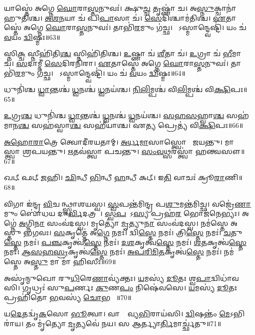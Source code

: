 𑌯𑌾𑌸𑍍𑌤𑍇॑ 𑌅𑌗𑍍𑌨𑍇 \ul{𑌘𑍋}𑌰𑌾\ul{𑌸𑍍𑌤}𑌨𑍁𑌵𑌃॑। 
𑌕𑍍𑌷𑍁\ul{𑌚𑍍𑌚} 𑌤𑍃𑌷𑍍𑌣𑌾॑ 𑌚। 
𑌅\ul{𑌸𑍍𑌨𑍁}𑌕𑍍𑌚𑌾𑌨𑌾॑𑌹𑍁𑌤𑌿𑌶𑍍𑌚। 
\ul{𑌅}\ul{𑌶}\ul{𑌨}𑌯𑌾 𑌚॑ 𑌪𑌿\ul{𑌪𑌾}𑌸𑌾 𑌚॑। 
\ul{𑌸𑍇}𑌦𑌿𑌶𑍍𑌚𑌾𑌮॑𑌤𑌿𑌶𑍍𑌚। 
\ul{𑌏}𑌤𑌾𑌸𑍍𑌤𑍇॑ 𑌅𑌗𑍍𑌨𑍇 \ul{𑌘𑍋}𑌰𑌾\ul{𑌸𑍍𑌤}𑌨𑍁𑌵𑌃॑। 
𑌤𑌾𑌭𑌿॑\ul{𑌰}𑌮𑍁𑌂 𑌗॑𑌚𑍍𑌛। 
𑌯𑍋᳚𑌽𑌸𑍍𑌮𑌾𑌨𑍍𑌦𑍍𑌵𑍇𑌷𑍍𑌟𑌿॑। 
𑌯𑌂 𑌚॑ \ul{𑌵}𑌯𑌂 \ul{𑌦𑍍𑌵𑌿}𑌷𑍍𑌮𑌃॥63॥
\anuvakamend

𑌸𑍍𑌨𑌿\ul{𑌕𑍍𑌚} 𑌸𑍍𑌨𑍀𑌹𑌿॑𑌤𑌿\ul{𑌶𑍍𑌚} 𑌸𑍍𑌨𑌿𑌹𑌿॑𑌤𑌿𑌶𑍍𑌚। 
\ul{𑌉}𑌷𑍍𑌣𑌾 𑌚॑ \ul{𑌶𑍀}𑌤𑌾 𑌚॑। 
\ul{𑌉}𑌗𑍍𑌰𑌾 𑌚॑ \ul{𑌭𑍀}𑌮𑌾 𑌚॑। 
\ul{𑌸}𑌦𑌾𑌮𑍍𑌨𑍀॑ \ul{𑌸𑍇}𑌦𑌿𑌰𑌨𑌿॑𑌰𑌾। 
\ul{𑌏}𑌤𑌾𑌸𑍍𑌤𑍇॑ 𑌅𑌗𑍍𑌨𑍇 \ul{𑌘𑍋}𑌰𑌾\ul{𑌸𑍍𑌤}𑌨𑍁𑌵𑌃॑। 
𑌤𑌾𑌭𑌿॑\ul{𑌰}𑌮𑍁𑌂 𑌗॑𑌚𑍍𑌛। 
𑌯𑍋᳚𑌽𑌸𑍍𑌮𑌾𑌨𑍍𑌦𑍍𑌵𑍇𑌷𑍍𑌟𑌿॑। 
𑌯𑌂 𑌚॑ \ul{𑌵}𑌯𑌂 \ul{𑌦𑍍𑌵𑌿}𑌷𑍍𑌮𑌃॥64॥
\anuvakamend

𑌧𑍁𑌨𑌿॑𑌶𑍍𑌚 \ul{𑌧𑍍𑌵𑌾}𑌨𑍍𑌤𑌶𑍍𑌚॑ \ul{𑌧𑍍𑌵}𑌨𑌶𑍍𑌚॑ \ul{𑌧𑍍𑌵}𑌨𑌯॑𑌶𑍍𑌚। 
\ul{𑌨𑌿}\ul{𑌲𑌿}𑌮𑍍𑌪𑌶𑍍𑌚॑ 𑌵𑌿\ul{𑌲𑌿}𑌮𑍍𑌪𑌶𑍍𑌚॑ 𑌵𑌿\ul{𑌕𑍍𑌷𑌿}𑌪𑌃॥65॥
\anuvakamend

\ul{𑌉}𑌗𑍍𑌰\ul{𑌶𑍍𑌚} 𑌧𑍁𑌨𑌿॑𑌶𑍍𑌚 \ul{𑌧𑍍𑌵𑌾}𑌨𑍍𑌤𑌶𑍍𑌚॑ \ul{𑌧𑍍𑌵}𑌨𑌶𑍍𑌚॑ \ul{𑌧𑍍𑌵}𑌨𑌯॑𑌶𑍍𑌚। 
\ul{𑌸}\ul{𑌹}\ul{𑌸}𑌹𑍍𑌵𑌾\ul{𑌶𑍍𑌚} 𑌸𑌹॑𑌮𑌾𑌨\ul{𑌶𑍍𑌚} 𑌸𑌹॑𑌸𑍍𑌵𑌾\ul{𑌶𑍍𑌚} 𑌸𑌹𑍀॑𑌯𑌾𑌶𑍍𑌚। 
𑌏\ul{𑌤𑍍𑌯} 𑌪𑍍𑌰𑍇𑌤𑍍𑌯॑ 𑌵𑌿\ul{𑌕𑍍𑌷𑌿}𑌪𑌃॥66॥
\anuvakamend


\ul{𑌅}\ul{𑌹𑍋}\ul{𑌰𑌾}𑌤𑍍𑌰𑍇 𑌤𑍍𑌵𑍋𑌦𑍀॑𑌰𑌯𑌤𑌾𑌮𑍍। 
\ul{𑌅}\ul{𑌰𑍍𑌧}\ul{𑌮𑌾}𑌸𑌾𑌸𑍍𑌤𑍍𑌵𑍋𑌦𑍀𑌂᳚ 𑌜𑌯𑌨𑍍𑌤𑍁। 
𑌮𑌾𑌸𑌾᳚𑌸𑍍𑌤𑍍𑌵𑌾 𑌶𑍍𑌰𑌪𑌯𑌨𑍍𑌤𑍁। 
\ul{𑌋}𑌤𑌵॑𑌸𑍍𑌤𑍍𑌵𑌾 𑌪𑌚𑌨𑍍𑌤𑍁। 
\ul{𑌸𑌂}\ul{𑌵}\ul{𑌥𑍍𑌸}𑌰𑌸𑍍𑌤𑍍𑌵𑌾॑ 𑌹𑌨𑍍𑌤𑍍𑌵𑌸𑍗॥67॥
\anuvakamend

𑌖𑌟𑍍 𑌫𑌟𑍍 \ul{𑌜}𑌹𑌿। 
\ul{𑌛𑌿}𑌨𑍍𑌧𑍀 \ul{𑌭𑌿}𑌨𑍍𑌧𑍀 \ul{𑌹}𑌨𑍍𑌧𑍀 𑌕𑌟𑍍। 
𑌇\ul{𑌤𑌿} 𑌵𑌾𑌚𑌃॑ 𑌕𑍍𑌰𑍂\ul{𑌰𑌾}𑌣𑌿॥68॥
\anuvakamend

𑌵𑌿𑌗𑌾 𑌇॑𑌨𑍍𑌦𑍍𑌰 \ul{𑌵𑌿}𑌚𑌰᳚𑌨𑍍𑌥𑍍𑌸𑍍𑌪𑌾𑌶𑌯𑌸𑍍𑌵। 
\ul{𑌸𑍍𑌵}𑌪𑌨𑍍𑌤॑𑌮𑌿𑌨𑍍𑌦𑍍𑌰 𑌪\ul{𑌶𑍁}𑌮𑌨𑍍𑌤॑𑌮𑌿𑌚𑍍𑌛। 
𑌵𑌜𑍍𑌰𑍇॑\ul{𑌣𑌾}𑌮𑍁𑌂 𑌬𑍋॑𑌧𑌯 𑌦𑍁\ul{𑌰𑍍𑌵𑌿}𑌦𑌤𑍍𑌰𑌮𑍍᳚। 
\ul{𑌸𑍍𑌵}\ul{𑌪}𑌤𑍋᳚𑌽\ul{𑌸𑍍𑌯} 𑌪𑍍𑌰𑌹॑\ul{𑌰} 𑌭𑍋𑌜॑𑌨𑍇𑌭𑍍𑌯𑌃। 
𑌅𑌗𑍍𑌨𑍇॑ \ul{𑌅}𑌗𑍍𑌨𑌿\ul{𑌨𑌾} 𑌸𑌂𑌵॑𑌦𑌸𑍍𑌵। 
𑌮𑍃𑌤𑍍𑌯𑍋॑ \ul{𑌮𑍃}𑌤𑍍𑌯𑍁\ul{𑌨𑌾} 𑌸𑌂𑌵॑𑌦𑌸𑍍𑌵। 
𑌨𑌮॑𑌸𑍍𑌤𑍇 𑌅𑌸𑍍𑌤𑍁 𑌭𑌗𑌵𑌃। 
\ul{𑌸}𑌕𑍃𑌤𑍍𑌤𑍇॑ 𑌅\ul{𑌗𑍍𑌨𑍇} 𑌨𑌮𑌃॑। 
𑌦𑍍𑌵𑌿\ul{𑌸𑍍𑌤𑍇} 𑌨𑌮𑌃॑। 
𑌤𑍍𑌰𑌿\ul{𑌸𑍍𑌤𑍇} 𑌨𑌮𑌃॑। 
\ul{𑌚}𑌤𑍁\ul{𑌸𑍍𑌤𑍇} 𑌨𑌮𑌃॑। 
\ul{𑌪}\ul{𑌞𑍍𑌚}𑌕𑍃𑌤𑍍𑌵॑\ul{𑌸𑍍𑌤𑍇} 𑌨𑌮𑌃॑। 
\ul{𑌦}\ul{𑌶}𑌕𑍃𑌤𑍍𑌵॑\ul{𑌸𑍍𑌤𑍇} 𑌨𑌮𑌃॑। 
\ul{𑌶}\ul{𑌤}𑌕𑍃𑌤𑍍𑌵॑\ul{𑌸𑍍𑌤𑍇} 𑌨𑌮𑌃॑। 
\ul{𑌆}\ul{𑌸}\ul{𑌹}\ul{𑌸𑍍𑌰}𑌕𑍃𑌤𑍍𑌵॑\ul{𑌸𑍍𑌤𑍇} 𑌨𑌮𑌃॑। 
\ul{𑌅}\ul{𑌪}\ul{𑌰𑌿}\ul{𑌮𑌿}\ul{𑌤}𑌕𑍃𑌤𑍍𑌵॑\ul{𑌸𑍍𑌤𑍇} 𑌨𑌮𑌃॑। 
𑌨𑌮॑𑌸𑍍𑌤𑍇 𑌅\ul{𑌸𑍍𑌤𑍁} 𑌮𑌾 𑌮𑌾॑ 𑌹𑌿𑌸𑍀𑌃॥69॥
\anuvakamend[𑌤𑍍𑌰𑌿\ul{𑌸𑍍𑌤𑍇} 𑌨𑌮𑌃॑ \ul{𑌸}𑌪𑍍𑌤 𑌚॑]

𑌅𑌸𑍃॑𑌨𑍍𑌮𑍁𑌖𑍋 𑌰𑍁\ul{𑌧𑌿}𑌰𑍇\ul{𑌣𑌾}𑌵𑍍𑌯॑𑌕𑍍𑌤𑌃। 
\ul{𑌯}𑌮𑌸𑍍𑌯॑ \ul{𑌦𑍂}𑌤𑌃  𑌶𑍍𑌵\ul{𑌪𑌾}𑌦𑍍𑌵𑌿𑌧𑌾॑𑌵𑌸𑌿। 
𑌗𑍃𑌧𑍍𑌰𑌃॑ 𑌸𑍁\ul{𑌪}𑌰𑍍𑌣𑌃 \ul{𑌕𑍁}𑌣\ul{𑌪𑌂} 𑌨𑌿𑌷𑍇॑𑌵𑌸𑍇। 
\ul{𑌯}𑌮𑌸𑍍𑌯॑ \ul{𑌦𑍂}𑌤𑌃 𑌪𑍍𑌰𑌹𑌿॑𑌤𑍋 \ul{𑌭}𑌵𑌸𑍍𑌯॑ \ul{𑌚𑍋}𑌭𑌯𑍋𑌃᳚॥70॥
\anuvakamend

𑌯\ul{𑌦𑍇}𑌤𑌦𑍍𑌵𑍃॑\ul{𑌕}𑌸𑍋 \ul{𑌭𑍂}𑌤𑍍𑌵𑌾। 
𑌵𑌾𑌗𑍍𑌦𑍇᳚𑌵𑍍𑌯\ul{𑌭𑌿}𑌰𑌾𑌯॑𑌸𑌿। 
\ul{𑌦𑍍𑌵𑌿}𑌷𑌨𑍍𑌤𑌂॑ \ul{𑌮𑍇}𑌽𑌭𑌿𑌰𑌾॑𑌯। 
𑌤𑌂 𑌮𑍃॑𑌤𑍍𑌯𑍋 \ul{𑌮𑍃}𑌤𑍍𑌯𑌵𑍇॑ 𑌨𑌯। 
𑌸 𑌆𑌰𑍍𑌤𑍍𑌯𑌾\ul{𑌰𑍍𑌤𑌿}𑌮𑌾𑌰𑍍𑌚𑍍𑌛॑𑌤𑍁॥71॥
\anuvakamend


